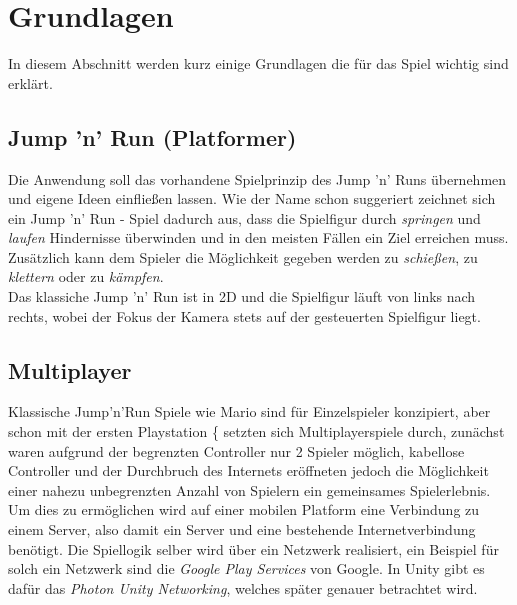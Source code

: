 \chapter{Grundlagen}
\label{cha:grundlagen}
In diesem Abschnitt werden kurz einige Grundlagen die für das Spiel wichtig sind erklärt. 

\section{Jump 'n' Run (Platformer)}
\label{sec:grundlagen:jumpnrun}
Die Anwendung soll das vorhandene Spielprinzip des Jump 'n' Runs übernehmen und eigene Ideen einfließen lassen. Wie der Name schon suggeriert zeichnet sich ein Jump 'n' Run - Spiel dadurch aus, dass die Spielfigur durch \textit{springen} und \textit{laufen} Hindernisse überwinden und in den meisten Fällen ein Ziel erreichen muss. Zusätzlich kann dem Spieler die Möglichkeit gegeben werden zu \textit{schießen}, zu \textit{klettern} oder zu \textit{kämpfen}. \\
Das klassiche Jump 'n' Run ist in 2D und die Spielfigur läuft von links nach rechts, wobei der Fokus der Kamera stets auf der gesteuerten Spielfigur liegt. 


\section{Multiplayer}
\label{sec:grundlagen:multiplayer}
Klassische Jump'n'Run Spiele wie Mario sind für Einzelspieler konzipiert, aber schon mit der ersten Playstation \{\cite{playstation} setzten sich Multiplayerspiele durch, zunächst waren aufgrund der begrenzten Controller nur 2 Spieler möglich, kabellose Controller und der Durchbruch des Internets eröffneten jedoch die Möglichkeit einer nahezu unbegrenzten Anzahl von Spielern ein gemeinsames Spielerlebnis. \\
Um dies zu ermöglichen wird auf einer mobilen Platform eine Verbindung zu einem Server, also damit ein Server und eine bestehende Internetverbindung benötigt. Die Spiellogik selber wird über ein Netzwerk realisiert, ein Beispiel für solch ein Netzwerk sind die \textit{Google Play Services} \cite{googleplayservices} von Google. In Unity gibt es dafür das \textit{Photon Unity Networking}, welches später genauer betrachtet wird.


